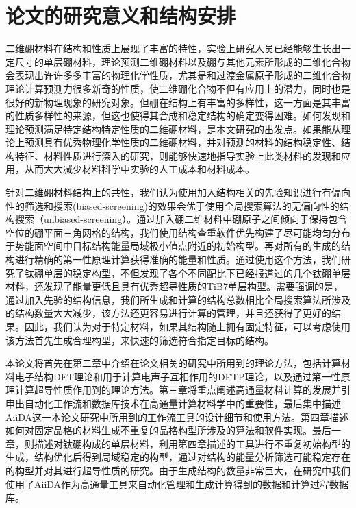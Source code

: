 \section{论文的研究意义和结构安排}
二维硼材料在结构和性质上展现了丰富的特性，实验上研究人员已经能够生长出一定尺寸的单层硼材料，理论预测二维硼材料以及硼与其他元素所形成的二维化合物会表现出许许多多丰富的物理化学性质，尤其是和过渡金属原子形成的二维化合物理论计算预测力很多新奇的性质，使二维硼化合物不但有应用上的潜力，同时也是很好的新物理现象的研究对象。但硼在结构上有丰富的多样性，这一方面是其丰富的性质多样性的来源，但这也使得其合成和稳定结构的确定变得困难。如何发现和理论预测满足特定结构特定性质的二维硼材料，是本文研究的出发点。如果能从理论上预测具有优秀物理化学性质的二维硼材料，并对预测的材料的结构稳定性、结构特征、材料性质进行深入的研究，则能够快速地指导实验上此类材料的发现和应用，从而大大减少材料科学中实验的人工成本和材料成本。

针对二维硼材料结构上的共性，我们认为使用加入结构相关的先验知识进行有偏向性的筛选和搜索(biased-screening)的效果会优于使用全局搜索算法的无偏向性的结构搜索（unbiased-screening）。通过加入硼二维材料中硼原子之间倾向于保持包含空位的硼平面三角网格的结构，我们使用结构查重软件优先构建了尽可能均匀分布于势能面空间中目标结构能量局域极小值点附近的初始构型。再对所有的生成的结构进行精确的第一性原理计算获得准确的能量和性质。通过使用这个方法，我们研究了钛硼单层的稳定构型，不但发现了各个不同配比下已经报道过的几个钛硼单层材料，还发现了能量更低且具有优秀超导性质的TiB7单层构型。需要强调的是，通过加入先验的结构信息，我们所生成和计算的结构总数相比全局搜索算法所涉及的结构数量大大减少，该方法还更容易进行计算的管理，并且还获得了更好的结果。因此，我们认为对于特定材料，如果其结构随上拥有固定特征，可以考虑使用该方法首先生成合理构型，来快速的筛选符合指定目标的结构。

本论文将首先在第二章中介绍在论文相关的研究中所用到的理论方法，包括计算材料电子结构DFT理论和用于计算电声子互相作用的DFTP理论，以及通过第一性原理计算超导性质作用到的理论方法。第三章将重点阐述高通量材料计算的发展并引申出自动化工作流和数据库技术在高通量计算材料学中的重要性，最后集中描述AiiDA这一本论文研究中所用到的工作流工具的设计细节和使用方法。第四章描述如何对固定晶格的材料生成不重复的晶格构型所涉及的算法和软件实现。最后一章，则描述对钛硼构成的单层材料，利用第四章描述的工具进行不重复初始构型的生成，结构优化后得到局域稳定的构型，通过对结构的能量分析筛选可能稳定存在的构型并对其进行超导性质的研究。由于生成结构的数量非常巨大，在研究中我们使用了AiiDA作为高通量工具来自动化管理和生成计算得到的数据和计算过程数据库。
